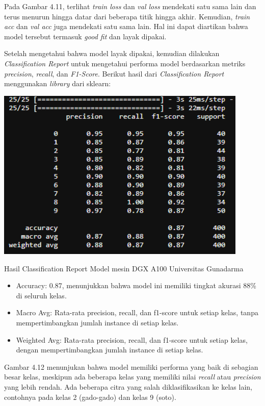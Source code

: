 Pada Gambar 4.11, terlihat \textit{train loss} dan \textit{val loss} mendekati satu sama lain dan terus menurun hingga datar dari beberapa titik hingga akhir. Kemudian, \textit{train acc} dan \textit{val acc} juga mendekati satu sama lain. Hal ini dapat diartikan bahwa model tersebut termasuk \textit{good fit} dan layak dipakai.

Setelah mengetahui bahwa model layak dipakai, kemudian dilakukan \textit{
Classification Report} untuk mengetahui performa model berdasarkan metriks \textit{precision}, \textit{recall}, dan \textit{F1-Score}. Berikut hasil dari \textit{Classification Report} menggunakan \textit{library} dari sklearn:

\pagebreak

\begin{afigure}
    \includegraphics[width=0.9\textwidth, center]{images/classification-report-dgx.png}
    \caption{Hasil Classification Report Model mesin DGX A100 Universitas Gunadarma}
    \label{fig:classification-report-dgx}
\end{afigure}


\begin{itemize}
    \item Accuracy: 0.87, menunjukkan bahwa model ini memiliki tingkat akurasi 88\% di seluruh kelas.
    \item Macro Avg: Rata-rata precision, recall, dan f1-score untuk setiap kelas, tanpa mempertimbangkan jumlah instance di setiap kelas.
    \item Weighted Avg: Rata-rata precision, recall, dan f1-score untuk setiap kelas, dengan mempertimbangkan jumlah instance di setiap kelas.
\end{itemize}

Gambar 4.12 menunjukan bahwa model memiliki performa yang baik di sebagian besar kelas, meskipun ada beberapa kelas yang memiliki nilai \textit{recall} atau \textit{precision} yang lebih rendah. Ada beberapa citra yang salah diklasifikasikan ke kelas lain, contohnya pada kelas 2 (gado-gado) dan kelas 9 (soto).

